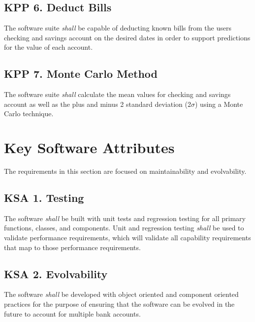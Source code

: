 \subsection{KPP 6. Deduct Bills}
The software suite {\textit{shall}} be capable of deducting known bills from the
users checking and savings account on the desired dates in order to support
predictions for the value of each account. 

\subsection{KPP 7. Monte Carlo Method}
The software suite {\textit{shall}} calculate the mean values for checking and 
savings account as well as the plus and minus 2 standard deviation (2$\sigma$) 
using a Monte Carlo technique.
\section{Key Software Attributes}
The requirements in this section are focused on maintainability and 
evolvability.

\subsection{KSA 1. Testing}
The software {\textit{shall}} be built with unit tests and regression testing
for all primary functions, classes, and components.  Unit and regression
testing {\textit{shall}} be used to validate performance requirements, which
will validate all capability requirements that map to those performance requirements.

\subsection{KSA 2. Evolvability}
The software {\textit{shall}} be developed with object oriented and component
oriented practices for the purpose of ensuring that the software can be evolved
in the future to account for multiple bank accounts.

